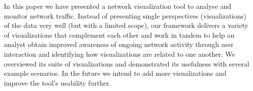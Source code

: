 In this paper we have presented a network visualization tool to analyse and monitor network traffic. Instead of presenting single perspectives (visualizations) of the data very well (but with a limited scope), our framework delivers a variety of visualizations that complement each other and work in tandem to help an analyst obtain improved awareness of ongoing network activity through user interaction and identifying how visualizations are related to one another. We overviewed its suite of visualizations and demonstrated its usefulness with several example scenarios. In the future we intend to add more visualizations and improve the tool's usability further.
